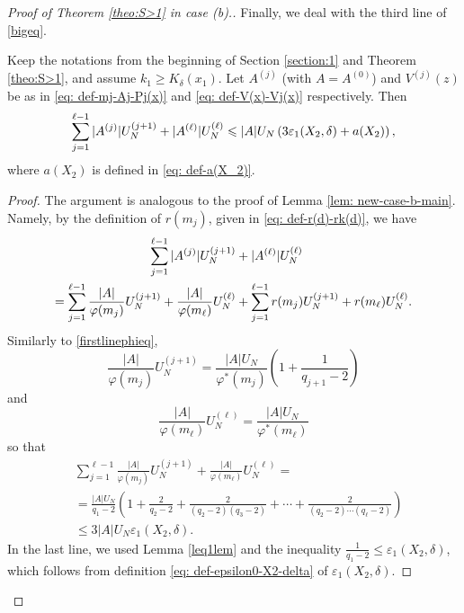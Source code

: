 \documentclass[12pt]{amsart}
\begin{document}
\begin{proof}[Proof of Theorem \ref{theo:S>1} in case (b).]
Finally, we deal with the third line of \eqref{bigeq}.
\begin{lemma} \label{lem: new-case-b-line-3}
Keep the notations from the beginning of Section \ref{section:1} and Theorem \ref{theo:S>1}, and assume $k_1 \ge K_{\delta}(x_1)$.
Let $A^{(j)}$ (with $A = A^{(0)}$) and $V^{(j)}(z)$ be as in \eqref{eq: def-mj-Aj-Pj(x)} and \eqref{eq: def-V(x)-Vj(x)} respectively. Then
\begin{equation}
    \sum_{j=1}^{\ell-1}|A^{(j)}|U_N^{(j+1)}+|A^{(\ell)}|U_N^{(\ell)}\notag \le |A|U_N \left(3\varepsilon_1(X_2,\delta)+a(X_2) \right),
\end{equation}
where $a(X_2)$ is defined in \eqref{eq: def-a(X_2)}.
\end{lemma}
\begin{proof}
The argument is analogous to the proof of Lemma \ref{lem: new-case-b-main}. Namely, by the definition of $r(m_j)$, given in \eqref{eq: def-r(d)-rk(d)}, we have
\begin{align}
    \sum_{j=1}^{\ell-1}|A^{(j)}|U_N^{(j+1)}&+|A^{(\ell)}|U_N^{(\ell)}\notag\\
    =\sum_{j=1}^{\ell-1}\frac{|A|}{\varphi(m_j)}U_N^{(j+1)}+\frac{|A|}{\varphi(m_\ell)}U_N^{(\ell)}&+\sum_{j=1}^{\ell-1}r(m_j)U_N^{(j+1)}+r(m_\ell)U_N^{(\ell)}\label{thirdlineeq}.
\end{align}
Similarly to \eqref{firstlinephieq},
\begin{equation*}
    \frac{|A|}{\varphi(m_j)}U_N^{(j+1)}=\frac{|A|U_N}{\varphi^*(m_j)}\left(1+\frac{1}{q_{j+1}-2}\right)
\end{equation*}
and 
\begin{equation*}
    \frac{|A|}{\varphi(m_\ell)}U_N^{(\ell)}=\frac{|A|U_N}{\varphi^*(m_\ell)}
\end{equation*}
so that
\begin{align*}
    &\sum_{j=1}^{\ell-1}\frac{|A|}{\varphi(m_j)}U_N^{(j+1)}+\frac{|A|}{\varphi(m_\ell)}U_N^{(\ell)}
    =\\
    &=\frac{|A|U_N}{q_1 - 2}\left(1+\frac{2}{q_2-2}+\frac{2}{(q_2-2)(q_3-2)}+\cdots+\frac{2}{(q_2-2)\cdots(q_\ell-2)}\right)\\
    &\le 3|A|U_N\varepsilon_1(X_2,\delta).
\end{align*}
In the last line, we used Lemma \ref{leq1lem} and the inequality $\frac{1}{q_1 - 2} \le \varepsilon_1(X_2, \delta)$, which follows from definition \eqref{eq: def-epsilon0-X2-delta} of $\varepsilon_1(X_2, \delta)$.


\end{proof}
\end{proof}
\end{document}
